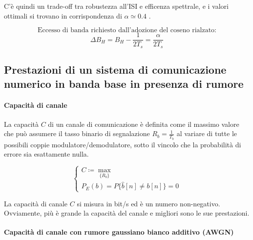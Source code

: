C'è quindi un trade-off tra robustezza all'ISI e efficenza spettrale, e i valori ottimali si trovano in corrispondenza di \( \alpha \simeq 0.4 \) .

\[ \text{Eccesso di banda richiesto dall'adozione del coseno rialzato:} \]
\[ \Delta B_{H} = B_{H} - \frac{1}{2T_s} = \frac{\alpha}{2T_s} \]



\subsection*{Prestazioni di un sistema di comunicazione numerico in banda base in presenza di rumore}

\paragraph*{Capacità di canale}

La capacità \( C \) di un canale di comunicazione è definita come il massimo valore che può assumere il tasso binario di segnalazione \( R_b = \frac{1}{T_b} \) al variare di tutte le possibili coppie modulatore/demodulatore, sotto il vincolo che la probabilità di errore sia esattamente nulla.


\[
    \begin{cases}
        C \coloneqq \max_{\{R_b\}} \\
        P_E(b) = P\{\hat{b}[n] \neq b[n]\} = 0
    \end{cases}
\]

La capacità di canale \( C \) si misura in bit/s ed è un numero non-negativo. Ovviamente, più è grande la capacità del canale e migliori sono le sue prestazioni.

\paragraph*{Capacità di canale con rumore gaussiano bianco additivo (AWGN)}

\begin{center}
\end{center}

